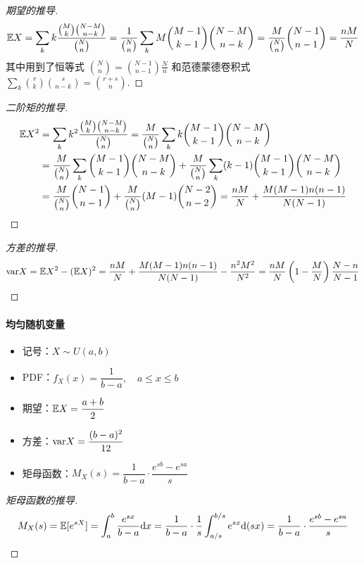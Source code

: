 \begin{proof}[期望的推导]
\[
\mathbb{E} X=\sum_kk\frac{\binom{M}{k}\binom{N-M}{n-k}}{\binom{N}{n}}=\frac{1}{\binom{N}{n}}\sum_k M\binom{M-1}{k-1}\binom{N-M}{n-k}=\frac{M}{\binom{N}{n}}\binom{N-1}{n-1}=\frac{nM}{N}
\]
其中用到了恒等式 $\displaystyle\binom{N}{n}=\binom{N-1}{n-1}\frac{N}{n}$ 和范德蒙德卷积式 $\displaystyle\sum_k\binom{r}{k}\binom{s}{n-k}=\binom{r+s}{n}$.
\end{proof}
\begin{proof}[二阶矩的推导]
\begin{align*}
\mathbb{E} X^2&=\sum_kk^2\frac{\binom{M}{k}\binom{N-M}{n-k}}{\binom{N}{n}}=\frac{M}{\binom{N}{n}}\sum_k k\binom{M-1}{k-1}\binom{N-M}{n-k}\\
&=\frac{M}{\binom{N}{n}}\sum_k\binom{M-1}{k-1}\binom{N-M}{n-k}+\frac{M}{\binom{N}{n}}\sum_k (k-1)\binom{M-1}{k-1}\binom{N-M}{n-k}\\
&=\frac{M}{\binom{N}{n}}\binom{N-1}{n-1}+\frac{M}{\binom{N}{n}}(M-1)\binom{N-2}{n-2}=\frac{nM}{N}+\frac{M(M-1)n(n-1)}{N(N-1)}
\end{align*}
\end{proof}
\begin{proof}[方差的推导]
\[
\mathrm{var} X=\mathbb{E} X^2-(\mathbb{E} X)^2=\frac{nM}{N}+\frac{M(M-1)n(n-1)}{N(N-1)}-\frac{n^2M^2}{N^2}=\frac{nM}{N}\left(1-\frac{M}{N}\right)\frac{N-n}{N-1}
\]
\end{proof}


\paragraph{均匀随机变量}

\begin{itemize}[itemsep=1ex]
    \item 记号：$X\sim U(a,b)$
    \item PDF：$f_X(x)=\dfrac{1}{b-a},\quad a\leqslant x\leqslant b$
    \item 期望：$\mathbb{E} X=\dfrac{a+b}{2}$
    \item 方差：$\mathrm{var} X=\dfrac{(b-a)^2}{12}$
    \item 矩母函数：$M_X(s)=\dfrac{1}{b-a}\cdot\dfrac{e^{sb}-e^{sa}}{s}$
\end{itemize}

\begin{proof}[矩母函数的推导]
\[
M_X(s)=\mathbb{E}[e^{sX}]=\int_a^b\frac{e^{sx}}{b-a}\mathrm dx=\frac{1}{b-a}\cdot\frac{1}{s}\int_{a/s}^{b/s}e^{sx}\mathrm d(sx)=\frac{1}{b-a}\cdot\frac{e^{sb}-e^{sa}}{s}
\]
\end{proof}

